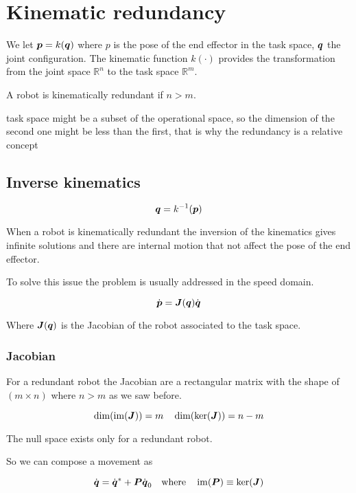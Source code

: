 \chapter{Kinematic redundancy}\label{ch:kinematic-redundancy}

We let $\boldsymbol{p}=k(\boldsymbol{q})$ where $p$ is the pose of the end effector in the task space, $\boldsymbol{q}$ the joint configuration.
The kinematic function $k(\cdot)$ provides the transformation from the joint space $\mathbb{R}^n$ to the task space $\mathbb{R}^m$.

A robot is kinematically redundant if $n > m$.

\begin{nb}task space might be a subset of the operational space, so the dimension of the second one might be less than the first, that is why the redundancy is a relative concept\end{nb}

\section{Inverse kinematics}

\[ \boldsymbol{q}=k^{-1}(\boldsymbol{p}) \]

When a robot is kinematically redundant the inversion of the kinematics gives infinite solutions and there are internal motion that not affect the pose of the end effector.

To solve this issue the problem is usually addressed in the speed domain.

\begin{equation}
	\dot{\boldsymbol{p}} = \boldsymbol{J}(\boldsymbol{q}) \dot{\boldsymbol{q}}
	\label{eq:inverse-constraint}
\end{equation}

Where $\boldsymbol{J}(\boldsymbol{q})$ is the Jacobian of the robot associated to the task space.

\subsection{Jacobian}

For a redundant robot the Jacobian are a rectangular matrix with the shape of $(m \times n)$ where $n > m$ as we saw before.

\[ \dim(\operatorname{im}(\boldsymbol{J})) = m \quad \dim(\ker(\boldsymbol{J})) = n - m \]

The null space exists only for a redundant robot.

So we can compose a movement as

\[ \dot{\boldsymbol{q}} = \dot{\boldsymbol{q}}^* + \boldsymbol{P} \dot{\boldsymbol{q}}_0 \quad \text{where} \quad \operatorname{im}(\boldsymbol{P}) \equiv \ker(\boldsymbol{J}) \]

